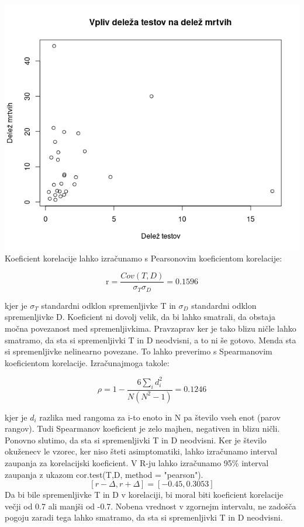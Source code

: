 \documentclass[a4paper,11pt]{article}
\begin{document}
\includegraphics[scale=0.6]{vpliv_delez_testov_na_delez_mrtvih}
Koeficient korelacije lahko izračunamo s Pearsonovim koeficientom korelacije:

\begin{center}
\[\text{r} = \frac{Cov(T,D)}{\sigma_{T} \sigma_{D}} = 0.1596\]
\end{center} 
kjer je \(\sigma_{T}\) standardni odklon spremenljivke T in \(\sigma_{D}\) standardni odklon spremenljivke D. Koeficient ni dovolj velik, da bi lahko smatrali, da obstaja močna povezanost med spremenljivkima. Pravzaprav ker je tako blizu ničle lahko smatramo, da sta si spremenljivki T in D neodvisni, a to ni še gotovo. Menda sta si spremenljivke nelinearno povezane. To lahko preverimo s Spearmanovim koeficientom korelacije. Izračunajmoga takole: 

\begin{center}
\[\rho = 1 - \frac{6\sum_{i}{}d_i^2}{N(N^2 - 1)} = 0.1246\]
\end{center} 

kjer je \( d_i \) razlika med rangoma za i-to enoto in N pa število vseh enot (parov rangov). Tudi Spearmanov koeficient je zelo majhen, negativen in blizu ničli. Ponovno slutimo, da sta si spremenljivki T in D neodvisni.
Ker je število okuženecv le vzorec, ker niso šteti asimptomatiki, lahko izračunamo interval zaupanja za korelacijski koeficient. V R-ju lahko izračunamo 95\% interval zaupanja z ukazom cor.test(T,D, method = "pearson").
\[[r - \Delta, r + \Delta] = [-0.45, 0.3053]\]
Da bi bile spremenljivke T in D v korelaciji, bi moral biti koeficient korelacije večji od 0.7 ali manjši od -0.7. Nobena vrednost v zgornejm intervalu, ne zadošča pogoju zaradi tega lahko smatramo, da sta si spremenljivki T in D neodvisni.
\end{document}
